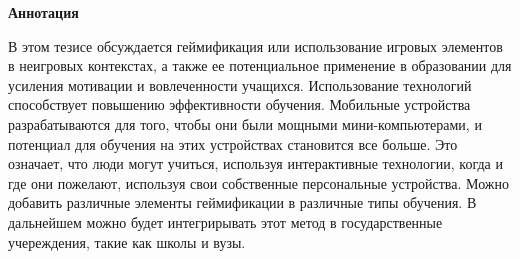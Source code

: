 \newpage
\pagestyle{plain}

{
\begin{center}
    \Large
    \textbf{Аннотация}
\end{center}
В этом тезисе обсуждается геймификация или использование игровых элементов в неигровых контекстах, а также ее потенциальное применение в образовании для усиления мотивации и вовлеченности учащихся. Использование технологий способствует повышению эффективности обучения. Мобильные устройства разрабатываются для того, чтобы они были мощными мини-компьютерами, и потенциал для обучения на этих устройствах становится все больше. Это означает, что люди могут учиться, используя интерактивные технологии, когда и где они пожелают, используя свои собственные персональные устройства. Можно добавить различные элементы геймификации  в различные типы обучения. В дальнейшем можно будет интегрирывать этот метод в государственные учереждения, такие как школы и вузы.
}